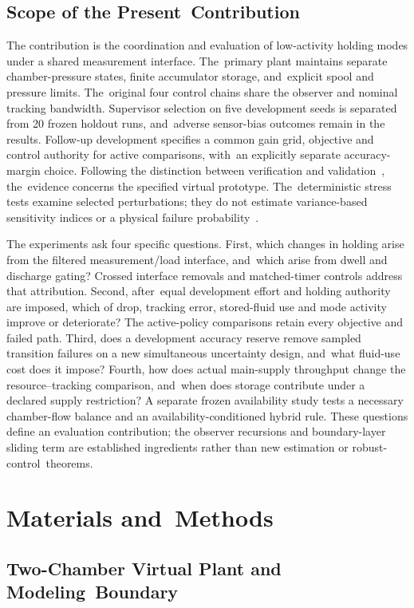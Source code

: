 \documentclass[machines,article,submit,pdftex,moreauthors]{Definitions/mdpi}
\begin{document}
\subsection{Scope of the Present~Contribution}
The contribution is the coordination and evaluation of low-activity holding modes under a shared measurement interface. The~primary plant maintains separate chamber-pressure states, finite accumulator storage, and~explicit spool and pressure limits. The~original four control chains share the observer and nominal tracking bandwidth. Supervisor selection on five development seeds is separated from 20 frozen holdout runs, and~adverse sensor-bias outcomes remain in the results. Follow-up development specifies a common gain grid, objective and control authority for active comparisons, with~an explicitly separate accuracy-margin choice. Following the distinction between verification and validation~\cite{sargent2013}, the~evidence concerns the specified virtual prototype. The~deterministic stress tests examine selected perturbations; they do not estimate variance-based sensitivity indices or a physical failure probability~\cite{saltelli2010}.

The experiments ask four specific questions. First, which changes in holding arise from the filtered measurement/load interface, and~which arise from dwell and discharge gating? Crossed interface removals and matched-timer controls address that attribution. Second, after~equal development effort and holding authority are imposed, which of drop, tracking error, stored-fluid use and mode activity improve or deteriorate? The active-policy comparisons retain every objective and failed path. Third, does a development accuracy reserve remove sampled transition failures on a new simultaneous uncertainty design, and~what fluid-use cost does it impose? Fourth, how does actual main-supply throughput change the resource--tracking comparison, and~when does storage contribute under a declared supply restriction? A separate frozen availability study tests a necessary chamber-flow balance and an availability-conditioned hybrid rule. These questions define an evaluation contribution; the observer recursions and boundary-layer sliding term are established ingredients rather than new estimation or robust-control~theorems.


\section{Materials and~Methods}
\unskip
\subsection{Two-Chamber Virtual Plant and Modeling~Boundary}
\label{sec3.1}
\end{document}
